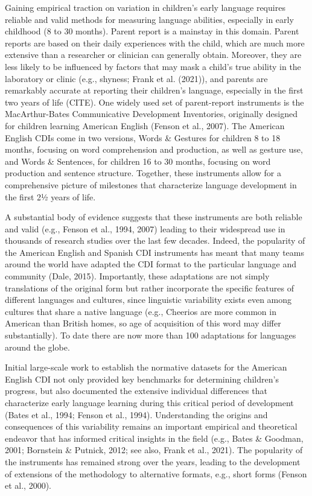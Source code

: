 \documentclass[
  english,
  man]{apa7}
\begin{document}
Gaining empirical traction on variation in children's early language requires reliable and valid methods for measuring language abilities, especially in early childhood (8 to 30 months). Parent report is a mainstay in this domain. Parent reports are based on their daily experiences with the child, which are much more extensive than a researcher or clinician can generally obtain. Moreover, they are less likely to be influenced by factors that may mask a child's true ability in the laboratory or clinic (e.g., shyness; Frank et al. (2021)), and parents are remarkably accurate at reporting their children's language, especially in the first two years of life (CITE). One widely used set of parent-report instruments is the MacArthur-Bates Communicative Development Inventories, originally designed for children learning American English (Fenson et al., 2007). The American English CDIs come in two versions, Words \& Gestures for children 8 to 18 months, focusing on word comprehension and production, as well as gesture use, and Words \& Sentences, for children 16 to 30 months, focusing on word production and sentence structure. Together, these instruments allow for a comprehensive picture of milestones that characterize language development in the first 2½ years of life.

A substantial body of evidence suggests that these instruments are both reliable and valid (e.g., Fenson et al., 1994, 2007) leading to their widespread use in thousands of research studies over the last few decades. Indeed, the popularity of the American English and Spanish CDI instruments has meant that many teams around the world have adapted the CDI format to the particular language and community (Dale, 2015). Importantly, these adaptations are not simply translations of the original form but rather incorporate the specific features of different languages and cultures, since linguistic variability exists even among cultures that share a native language (e.g., Cheerios are more common in American than British homes, so age of acquisition of this word may differ substantially). To date there are now more than 100 adaptations for languages around the globe.

Initial large-scale work to establish the normative datasets for the American English CDI not only provided key benchmarks for determining children's progress, but also documented the extensive individual differences that characterize early language learning during this critical period of development (Bates et al., 1994; Fenson et al., 1994). Understanding the origins and consequences of this variability remains an important empirical and theoretical endeavor that has informed critical insights in the field (e.g., Bates \& Goodman, 2001; Bornstein \& Putnick, 2012; see also, Frank et al., 2021). The popularity of the instruments has remained strong over the years, leading to the development of extensions of the methodology to alternative formats, e.g., short forms (Fenson et al., 2000).
\end{document}
